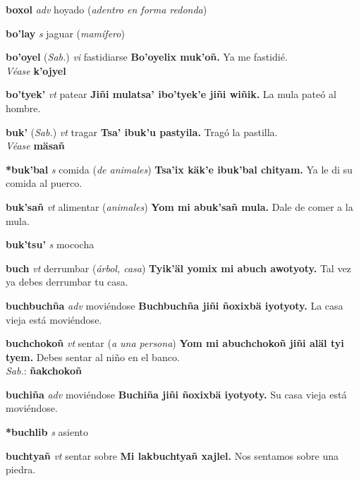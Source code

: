 \documentclass[10pt]{scrbook}
\newcommand{\entry}[1]{\textbf{#1}}
\newcommand{\partofspeech}[1]{\textit{#1}}
\newcommand{\spanishtranslation}[1]{#1}
\newcommand{\clarification}[1]{(\textit{#1})}
\newcommand{\cholexample}[1]{\textbf{#1}}
\newcommand{\exampletranslation}[1]{#1}
\newcommand{\dialectvariant}[1]{\\\textit{#1}:}
\newcommand{\dialectword}[1]{\textbf{#1}}
\newcommand{\alsosee}[1]{\\\textit{Véase} \textbf{#1}}
\newcommand{\relevantdialect}[1]{(\textit{#1})}
\begin{document}
\begin{multicols}{2}
\entry{boxol}
\partofspeech{adv}
\spanishtranslation{hoyado}
\clarification{adentro en forma redonda}

\entry{bo'lay}
\partofspeech{s}
\spanishtranslation{jaguar}
\clarification{mamífero}

\entry{bo'oyel}
\relevantdialect{Sab.}
\partofspeech{vi}
\spanishtranslation{fastidiarse}
\cholexample{Bo'oyelix muk'oñ.}
\exampletranslation{Ya me fastidié.}
\alsosee{k'ojyel}

\entry{bo'tyek'}
\partofspeech{vt}
\spanishtranslation{patear}
\cholexample{Jiñi mulatsa' ibo'tyek'e jiñi wiñik.}
\exampletranslation{La mula pateó al hombre.}

\entry{buk'}
\relevantdialect{Sab.}
\partofspeech{vt}
\spanishtranslation{tragar}
\cholexample{Tsa' ibuk'u pastyila.}
\exampletranslation{Tragó la pastilla.}
\alsosee{mäsañ}

\entry{*buk'bal}
\partofspeech{s}
\spanishtranslation{comida}
\clarification{de animales}
\cholexample{Tsa'ix käk'e ibuk'bal chityam.}
\exampletranslation{Ya le di su comida al puerco.}

\entry{buk'sañ}
\partofspeech{vt}
\spanishtranslation{alimentar}
\clarification{animales}
\cholexample{Yom mi abuk'sañ mula.}
\exampletranslation{Dale de comer a la mula.}

\entry{buk'tsu'}
\partofspeech{s}
\spanishtranslation{mococha}

\entry{buch}
\partofspeech{vt}
\spanishtranslation{derrumbar}
\clarification{árbol, casa}
\cholexample{Tyik'äl yomix mi abuch awotyoty.}
\exampletranslation{Tal vez ya debes derrumbar tu casa.}

\entry{buchbuchña}
\partofspeech{adv}
\spanishtranslation{moviéndose}
\cholexample{Buchbuchña jiñi ñoxixbä iyotyoty.}
\exampletranslation{La casa vieja está moviéndose.}

\entry{buchchokoñ}
\partofspeech{vt}
\spanishtranslation{sentar}
\clarification{a una persona}
\cholexample{Yom mi abuchchokoñ jiñi aläl tyi tyem.}
\exampletranslation{Debes sentar al niño en el banco.}
\dialectvariant{Sab.}
\dialectword{ñakchokoñ}

\entry{buchiña}
\partofspeech{adv}
\spanishtranslation{moviéndose}
\cholexample{Buchiña jiñi ñoxixbä iyotyoty.}
\exampletranslation{Su casa vieja está moviéndose.}

\entry{*buchlib}
\partofspeech{s}
\spanishtranslation{asiento}

\entry{buchtyañ}
\partofspeech{vt}
\spanishtranslation{sentar sobre}
\cholexample{Mi lakbuchtyañ xajlel.}
\exampletranslation{Nos sentamos sobre una piedra.}


\end{multicols}
\end{document}
